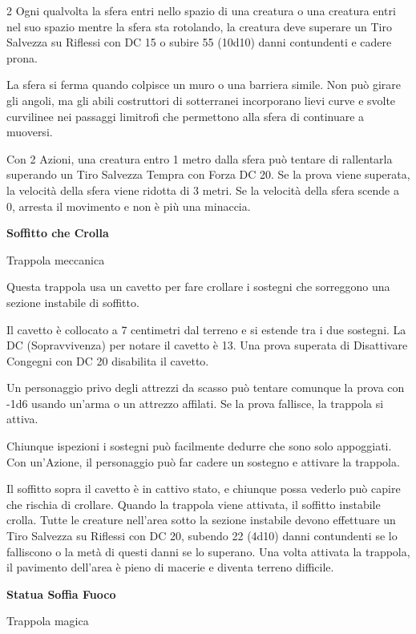 \begin{multicols}{2}
Ogni qualvolta la sfera entri nello spazio di una creatura o una creatura entri nel suo spazio mentre la sfera sta rotolando, la creatura deve superare un Tiro Salvezza su Riflessi con DC 15 o subire 55 (10d10) danni contundenti e cadere prona.

La sfera si ferma quando colpisce un muro o una barriera simile. Non può girare gli angoli, ma gli abili costruttori di sotterranei incorporano lievi curve e svolte curvilinee nei passaggi limitrofi che permettono alla sfera di continuare a muoversi.

Con 2 Azioni, una creatura entro 1 metro dalla sfera può tentare di rallentarla superando un Tiro Salvezza Tempra con Forza DC 20. Se la prova viene superata, la velocità della sfera viene ridotta di 3 metri. Se la velocità della sfera scende a 0, arresta il movimento e non è più una minaccia.

\medskip

\textbf{Soffitto che Crolla}

Trappola meccanica

Questa trappola usa un cavetto per fare crollare i sostegni che sorreggono una sezione instabile di soffitto.

Il cavetto è collocato a 7 centimetri dal terreno e si estende tra i due sostegni. La DC (Sopravvivenza) per notare il cavetto è 13. Una prova superata di Disattivare Congegni con DC 20 disabilita il cavetto.

Un personaggio privo degli attrezzi da scasso può tentare comunque la prova con -1d6 usando un'arma o un attrezzo affilati. Se la prova fallisce, la trappola si attiva.

Chiunque ispezioni i sostegni può facilmente dedurre che sono solo appoggiati. Con un'Azione, il personaggio può far cadere un sostegno e attivare la trappola.

Il soffitto sopra il cavetto è in cattivo stato, e chiunque possa vederlo può capire che rischia di crollare. Quando la trappola viene attivata, il soffitto instabile crolla. Tutte le creature nell'area sotto la sezione instabile devono effettuare un Tiro Salvezza su Riflessi con DC 20, subendo 22 (4d10) danni contundenti se lo falliscono o la metà di questi danni se lo superano. Una volta attivata la trappola, il pavimento dell'area è pieno di macerie e diventa terreno difficile.

\medskip

\textbf{Statua Soffia Fuoco}

Trappola magica


\end{multicols}
